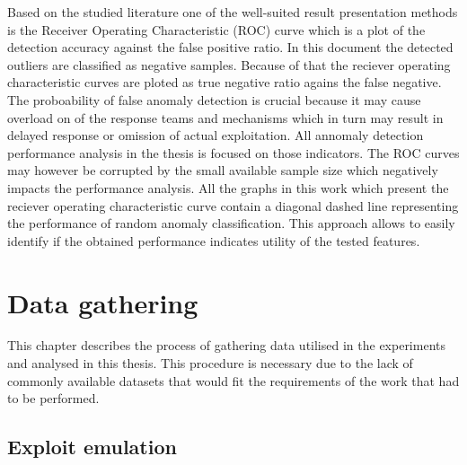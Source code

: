 \documentclass[a4paper,twoside,12pt]{book}
\begin{document}
Based on the studied literature one of the well-suited result presentation methods is the Receiver 
Operating Characteristic (ROC) curve which is a plot of the detection accuracy against the false 
positive ratio. In this document the detected outliers are classified as negative samples. Because 
of that the reciever operating characteristic curves are ploted as true negative ratio agains the 
false negative. The proboability of false anomaly detection is crucial because it may cause overload
on of the response teams and mechanisms which in turn may result in delayed response or omission
of actual exploitation. All annomaly detection performance analysis in the thesis is focused
on those indicators. The ROC curves may however be corrupted by the small available sample size 
which negatively impacts the performance analysis. All the graphs in this work which present
the reciever operating characteristic curve contain a diagonal dashed line representing the
performance of random anomaly classification. This approach allows to easily identify if the obtained
performance indicates utility of the tested features.



\chapter{Data gathering}

This chapter describes the process of gathering data utilised in the experiments and 
analysed in this thesis. This procedure is necessary due to the lack of commonly available 
datasets that would fit the requirements of the work that had to be performed. 

\section{Exploit emulation}
\end{document}
